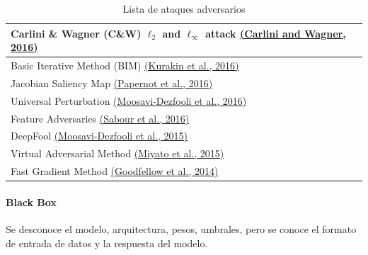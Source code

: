 \begin{table}[H]
\begin{tabularx}{\linewidth}{|X|}
        Carlini \& Wagner (C\&W) ${\ell_{2}}$ and ${\ell_{\infty}}$ attack \href{https://arxiv.org/abs/1608.04644}{(Carlini and Wagner, 2016)}                                                                               \\ \hline
        Basic Iterative Method (BIM) \href{https://arxiv.org/abs/1607.02533}{(Kurakin et al., 2016)}                                                                                                                         \\ \hline
        Jacobian Saliency Map \href{https://arxiv.org/abs/1511.07528}{(Papernot et al., 2016)}                                                                                                                               \\ \hline
        Universal Perturbation \href{https://arxiv.org/abs/1610.08401}{(Moosavi-Dezfooli et al., 2016)}                                                                                                                      \\ \hline
        Feature Adversaries \href{https://arxiv.org/abs/1511.05122}{(Sabour et al., 2016)}                                                                                                                                   \\ \hline
        DeepFool \href{https://arxiv.org/abs/1511.04599}{(Moosavi-Dezfooli et al., 2015)}                                                                                                                                    \\ \hline
        Virtual Adversarial Method \href{https://arxiv.org/abs/1507.00677}{(Miyato et al., 2015)}                                                                                                                            \\ \hline
        Fast Gradient Method \href{https://arxiv.org/abs/1412.6572}{(Goodfellow et al., 2014)}                                                                                                                               \\ \hline
    \end{tabularx}
    \caption{Lista de ataques adversarios}
    \label{tab:my-table-white-box}
\end{table}

\clearpage
\paragraph{Black Box}
Se desconoce el modelo, arquitectura, pesos, umbrales, pero se conoce el formato de entrada de datos y la respuesta del modelo. \cite{learning-machine-learning-part-3-attacking}

